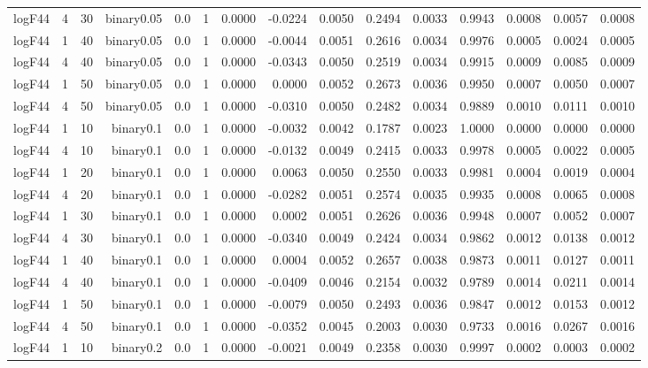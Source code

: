 \begin{longtable}{rrrrrrrrrrrrrrr}
  logF44 & 4 & 30 & binary0.05 & 0.0 & 1 & 0.0000 & -0.0224 & 0.0050 & 0.2494 & 0.0033 & 0.9943 & 0.0008 & 0.0057 & 0.0008 \\ 
  logF44 & 1 & 40 & binary0.05 & 0.0 & 1 & 0.0000 & -0.0044 & 0.0051 & 0.2616 & 0.0034 & 0.9976 & 0.0005 & 0.0024 & 0.0005 \\ 
  logF44 & 4 & 40 & binary0.05 & 0.0 & 1 & 0.0000 & -0.0343 & 0.0050 & 0.2519 & 0.0034 & 0.9915 & 0.0009 & 0.0085 & 0.0009 \\ 
  logF44 & 1 & 50 & binary0.05 & 0.0 & 1 & 0.0000 & 0.0000 & 0.0052 & 0.2673 & 0.0036 & 0.9950 & 0.0007 & 0.0050 & 0.0007 \\ 
  logF44 & 4 & 50 & binary0.05 & 0.0 & 1 & 0.0000 & -0.0310 & 0.0050 & 0.2482 & 0.0034 & 0.9889 & 0.0010 & 0.0111 & 0.0010 \\ 
  logF44 & 1 & 10 & binary0.1 & 0.0 & 1 & 0.0000 & -0.0032 & 0.0042 & 0.1787 & 0.0023 & 1.0000 & 0.0000 & 0.0000 & 0.0000 \\ 
  logF44 & 4 & 10 & binary0.1 & 0.0 & 1 & 0.0000 & -0.0132 & 0.0049 & 0.2415 & 0.0033 & 0.9978 & 0.0005 & 0.0022 & 0.0005 \\ 
  logF44 & 1 & 20 & binary0.1 & 0.0 & 1 & 0.0000 & 0.0063 & 0.0050 & 0.2550 & 0.0033 & 0.9981 & 0.0004 & 0.0019 & 0.0004 \\ 
  logF44 & 4 & 20 & binary0.1 & 0.0 & 1 & 0.0000 & -0.0282 & 0.0051 & 0.2574 & 0.0035 & 0.9935 & 0.0008 & 0.0065 & 0.0008 \\ 
  logF44 & 1 & 30 & binary0.1 & 0.0 & 1 & 0.0000 & 0.0002 & 0.0051 & 0.2626 & 0.0036 & 0.9948 & 0.0007 & 0.0052 & 0.0007 \\ 
  logF44 & 4 & 30 & binary0.1 & 0.0 & 1 & 0.0000 & -0.0340 & 0.0049 & 0.2424 & 0.0034 & 0.9862 & 0.0012 & 0.0138 & 0.0012 \\ 
  logF44 & 1 & 40 & binary0.1 & 0.0 & 1 & 0.0000 & 0.0004 & 0.0052 & 0.2657 & 0.0038 & 0.9873 & 0.0011 & 0.0127 & 0.0011 \\ 
  logF44 & 4 & 40 & binary0.1 & 0.0 & 1 & 0.0000 & -0.0409 & 0.0046 & 0.2154 & 0.0032 & 0.9789 & 0.0014 & 0.0211 & 0.0014 \\ 
  logF44 & 1 & 50 & binary0.1 & 0.0 & 1 & 0.0000 & -0.0079 & 0.0050 & 0.2493 & 0.0036 & 0.9847 & 0.0012 & 0.0153 & 0.0012 \\ 
  logF44 & 4 & 50 & binary0.1 & 0.0 & 1 & 0.0000 & -0.0352 & 0.0045 & 0.2003 & 0.0030 & 0.9733 & 0.0016 & 0.0267 & 0.0016 \\ 
  logF44 & 1 & 10 & binary0.2 & 0.0 & 1 & 0.0000 & -0.0021 & 0.0049 & 0.2358 & 0.0030 & 0.9997 & 0.0002 & 0.0003 & 0.0002 \\ 

\end{longtable}
